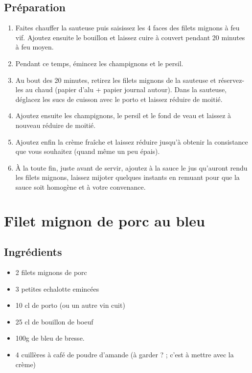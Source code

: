 \subsection*{Préparation}
\begin{enumerate}
\item Faites chauffer la sauteuse puis saisissez les 4 faces des filets mignons à feu vif. Ajoutez ensuite le bouillon et laissez cuire à couvert pendant 20 minutes à feu moyen.
\item Pendant ce temps, émincez les champignons et le persil.
\item Au bout des 20 minutes, retirez les filets mignons de la sauteuse et réservez-les au chaud (papier d'alu + papier journal autour). Dans la sauteuse, déglacez les sucs de cuisson avec le porto et laissez réduire de moitié.
\item Ajoutez ensuite les champignons, le persil et le fond de veau et laissez à nouveau réduire de moitié.
\item Ajoutez enfin la crème fraîche et laissez réduire jusqu'à obtenir la consistance que vous souhaitez (quand même un peu épais).
\item À la toute fin, juste avant de servir, ajoutez à la sauce le jus qu'auront rendu les filets mignons, laissez mijoter quelques instants en remuant pour que la sauce soit homogène et à votre convenance.
\end{enumerate}

\newpage
\section{Filet mignon de porc au bleu}
\subsection*{Ingrédients}
\begin{itemize}
\item 2 filets mignons de porc
\item 3 petites echalotte emincées
\item 10 cl de porto (ou un autre vin cuit)
\item 25 cl de bouillon de boeuf
\item 100g de bleu de bresse.
\item 4 cuillères à café de poudre d'amande (à garder ? ; c'est à mettre avec la crème)
\end{itemize}

